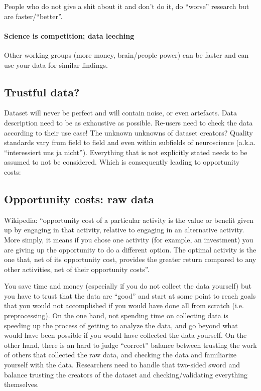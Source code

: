 %
People who do not give a shit about it and don't do it, do ``worse'' research
but are faster/``better''.


\paragraph{Science is competition; data leeching}
%
Other working groups (more money, brain/people power) can be faster and can use
your data for similar findings.


\subsection{Trustful data?}

%
Dataset will never be perfect and will contain noise, or even artefacts.
%
Data description need to be as exhaustive as possible.
%
Re-users need to check the data according to their use case!
%
The unknown unknowns of dataset creators?
%
Quality standards vary from field to field and even within subfields of
neuroscience (a.k.a. ``interessiert uns ja nicht'').
%
Everything that is not explicitly stated needs to be assumed to not be
considered.
%
Which is consequently leading to opportunity costs:


\subsection{Opportunity costs: raw data}

Wikipedia: ``opportunity cost of a particular activity is the value or benefit
given up by engaging in that activity, relative to engaging in an alternative
activity.
%
More simply, it means if you chose one activity (for example, an investment) you
are giving up the opportunity to do a different option.
%
The optimal activity is the one that, net of its opportunity cost, provides the
greater return compared to any other activities, net of their opportunity
costs''.

%
You save time and money (especially if you do not collect the data yourself) but
you have to trust that the data are ``good'' and start at some point to reach
goals that you would not accomplished if you would have done all from scratch
(i.e. preprocessing).
%
On the one hand, not spending time on collecting data is speeding up the process
of getting to analyze the data, and go beyond what would have been possible if
you would have collected the data yourself.
%
On the other hand, there is an hard to judge ``correct'' balance between
trusting the work of others that collected the raw data, and checking the data
and familiarize yourself with the data.
%
Researchers need to handle that two-sided sword and balance trusting the
creators of the dataset and checking/validating everything themselves.

